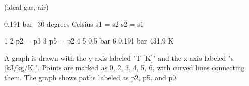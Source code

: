 (ideal gas, air)

0.191 bar  
-30 degrees Celsius  
s1 = s2  
s2 = s1

1  
2  p2 = p3  
3  p5 = p2  
4  
5  0.5 bar  
6  0.191 bar  431.9 K

A graph is drawn with the y-axis labeled "T [K]" and the x-axis labeled "s [kJ/kg/K]". Points are marked as 0, 2, 3, 4, 5, 6, with curved lines connecting them. The graph shows paths labeled as p2, p5, and p0.